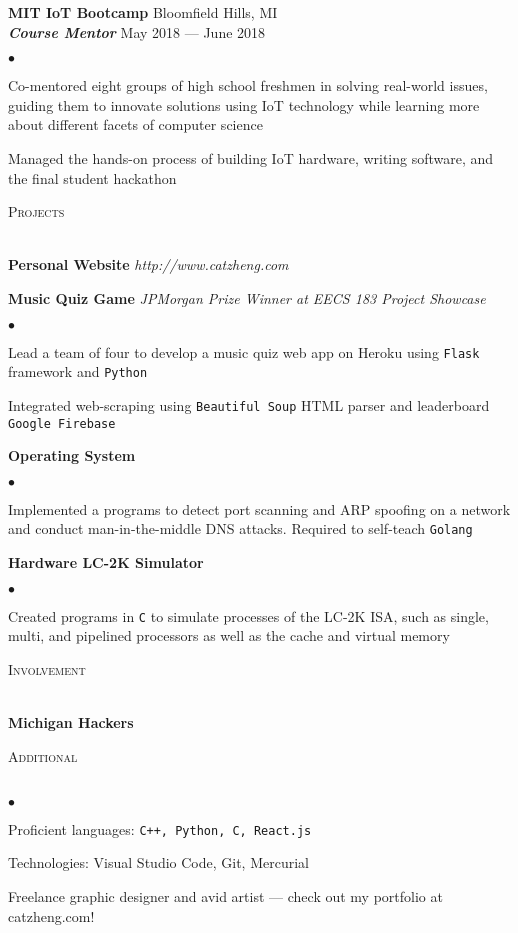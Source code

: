 \documentclass[a4paper, 11pt]{article}
\newcommand{\lineunder}{\vspace*{-8pt} \\ \hspace*{-20pt} \hrulefill \\}
\newcommand{\header}[1]{{\hspace*{-20pt}\vspace*{6pt} \large\textsc{#1}} \vspace*{-5pt} \lineunder \vspace{3pt}}
\newcommand{\employer}[4]{{ \normalsize\textbf{#1} \small\hfill{#2}\\ {\small\textbf{\emph{#3}}} \small\hfill{#4}\\ }}
\newenvironment{achievements}{\begin{list}{$\bullet$}{\topsep 0pt \itemsep 0pt}}{\vspace*{5pt}\end{list}}
\begin{document}
\employer{MIT IoT Bootcamp}{Bloomfield Hills, MI}{Course Mentor}{May 2018 --- June 2018}
	\begin{achievements}
	\item Co-mentored eight groups of high school freshmen in solving real-world issues, guiding them to innovate solutions using IoT technology while learning more about different facets of computer science
	\item Managed the hands-on process of building IoT hardware, writing software, and the final student hackathon
	\end{achievements}

\header{Projects}

\textbf{Personal Website} \textit{http://www.catzheng.com}
\small
\vspace{3pt}

\textbf{Music Quiz Game} \textit{JPMorgan Prize Winner at EECS 183 Project Showcase}
\small
\vspace{2pt}
\begin{achievements}
\item Lead a team of four to develop a music quiz web app on Heroku using \texttt{Flask} framework and \texttt{Python}
\item Integrated web-scraping using \texttt{Beautiful Soup\texttrademark} HTML parser and leaderboard \texttt{Google Firebase\texttrademark}
\end{achievements}

\textbf{Operating System}
\small
\vspace{2pt}
\begin{achievements}
\item Implemented a programs to detect port scanning and ARP spoofing on a network and conduct man-in-the-middle DNS attacks. Required to self-teach \texttt{Golang}
\end{achievements}

\textbf{Hardware LC-2K Simulator}
\small
\vspace{2pt}
\begin{achievements}
\item Created programs in \texttt{C} to simulate processes of the LC-2K ISA, such as single, multi, and pipelined processors as well as the cache and virtual memory
\end{achievements}

\header{Involvement}

\textbf{Michigan Hackers}
\small
\vspace{0.25cm}

\header{Additional}
\begin{achievements}
\item Proficient languages: \texttt{C++, Python, C, React.js}
\item Technologies: Visual Studio Code, Git, Mercurial
\item Freelance graphic designer and avid artist --- check out my portfolio at catzheng.com!
\end{achievements}
\end{document}

